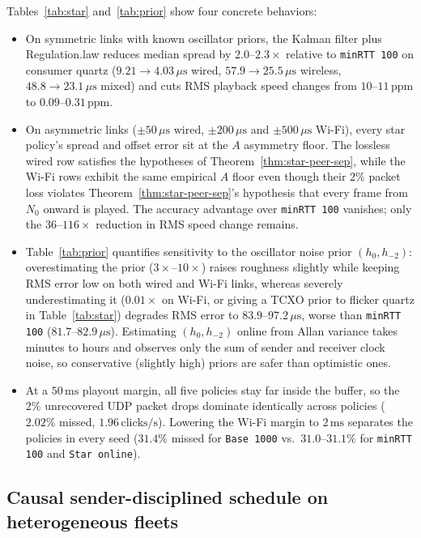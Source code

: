 \documentclass[11pt,a4paper]{article}
\DeclareRobustCommand{\lean}[1]{{\ttfamily\def\_{\textunderscore\allowbreak}#1}}
\theoremstyle{definition}
\begin{document}
Tables~\ref{tab:star} and~\ref{tab:prior} show four concrete behaviors:
\begin{itemize}
\item On symmetric links with known oscillator priors, the Kalman filter plus
  \lean{Regulation.law} reduces median spread by $2.0$--$2.3\times$ relative to
  \texttt{minRTT 100} on consumer quartz ($9.21 \to 4.03\,\mu\text{s}$ wired,
  $57.9 \to 25.5\,\mu\text{s}$ wireless, $48.8 \to 23.1\,\mu\text{s}$ mixed)
  and cuts RMS playback speed changes from $10$--$11\,\text{ppm}$ to
  $0.09$--$0.31\,\text{ppm}$.
\item On asymmetric links ($\pm 50\,\mu\text{s}$ wired, $\pm 200\,\mu\text{s}$
  and $\pm 500\,\mu\text{s}$ Wi-Fi), every star policy's spread and offset
  error sit at the $A$ asymmetry floor. The lossless wired row satisfies the
  hypotheses of Theorem~\ref{thm:star-peer-sep}, while the Wi-Fi rows exhibit
  the same empirical $A$ floor even though their $2\%$ packet loss violates
  Theorem~\ref{thm:star-peer-sep}'s hypothesis that every frame from $N_0$
  onward is played. The accuracy advantage over \texttt{minRTT 100} vanishes;
  only the $36$--$116\times$ reduction in RMS speed change remains.
\item Table~\ref{tab:prior} quantifies sensitivity to the oscillator noise
  prior $(h_0, h_{-2})$: overestimating the prior ($3\times$--$10\times$)
  raises roughness slightly while keeping RMS error low on both wired and Wi-Fi
  links, whereas severely underestimating it ($0.01\times$ on Wi-Fi, or giving
  a TCXO prior to flicker quartz in Table~\ref{tab:star}) degrades RMS error to
  $83.9$--$97.2\,\mu\text{s}$, worse than \texttt{minRTT 100}
  ($81.7$--$82.9\,\mu\text{s}$). Estimating $(h_0, h_{-2})$ online from Allan
  variance takes minutes to hours and observes only the sum of sender and
  receiver clock noise, so conservative (slightly high) priors are safer than
  optimistic ones.
\item At a $50\,\text{ms}$ playout margin, all five policies stay far inside
  the buffer, so the $2\%$ unrecovered UDP packet drops dominate identically
  across policies ($2.02\%$ missed, $1.96\,\text{clicks/s}$). Lowering the
  Wi-Fi margin to $2\,\text{ms}$ separates the policies in every seed
  ($31.4\%$ missed for \texttt{Base 1000} vs.\ $31.0$--$31.1\%$ for
  \texttt{minRTT 100} and \texttt{Star online}).
\end{itemize}

\subsection{Causal sender-disciplined schedule on heterogeneous fleets}
\label{sec:sim-sched}
\end{document}
